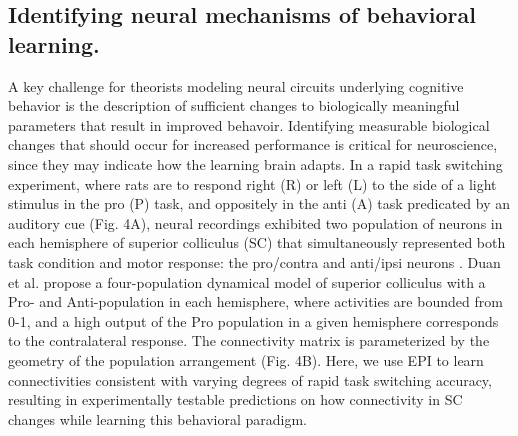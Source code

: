 \documentclass[11pt]{article}
\begin{document}
\subsection{Identifying neural mechanisms of behavioral learning.} 
A key challenge for theorists modeling neural circuits underlying cognitive behavior is the description of sufficient changes to biologically meaningful parameters that result in improved behavoir.
Identifying measurable biological changes that should occur for increased performance is critical for neuroscience, since they may indicate how the learning brain adapts.  
In a rapid task switching experiment, where rats are to respond right (R) or left (L) to the side of a light stimulus in the pro (P) task, and oppositely in the anti (A) task predicated by an auditory cue (Fig. 4A), neural recordings exhibited two population of neurons in each hemisphere of superior colliculus (SC) that simultaneously represented both task condition and motor response: the pro/contra and anti/ipsi neurons \cite{duan2018collicular}.  Duan et al. propose a four-population dynamical model of superior colliculus with a Pro- and Anti-population in each hemisphere, where activities are bounded from 0-1, and a high output of the Pro population in a given hemisphere corresponds to the  contralateral response. The connectivity matrix is parameterized by the geometry of the population arrangement (Fig. 4B). Here, we use EPI to learn connectivities consistent with varying degrees of rapid task switching accuracy, resulting in experimentally testable predictions on how connectivity in SC changes while learning this behavioral paradigm.
\end{document}
